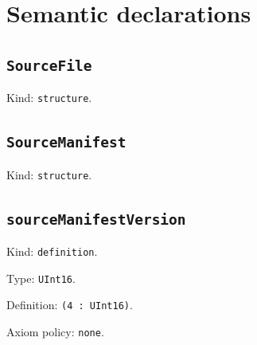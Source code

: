 \documentclass[11pt]{article}
\begin{document}
\section*{Semantic declarations}
\subsection*{\texttt{SourceFile}}
\noindent Kind: \texttt{structure}.\par
\subsection*{\texttt{SourceManifest}}
\noindent Kind: \texttt{structure}.\par
\subsection*{\texttt{sourceManifestVersion}}
\noindent Kind: \texttt{definition}.\par
\noindent Type: \texttt{UInt16}.\par
\noindent Definition: \texttt{(4 : UInt16)}.\par
\noindent Axiom policy: \texttt{none}.\par
\end{document}
